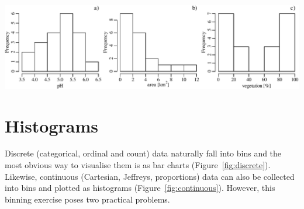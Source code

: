 \noindent\includegraphics[width=\textwidth]{../figures/continuous.pdf}\medskip
\begingroup {}
\label{fig:continuous}
\endgroup

\section{Histograms}\label{sec:histogram}

Discrete (categorical, ordinal and count) data naturally fall into
bins and the most obvious way to visualise them is as bar charts
(Figure~\ref{fig:discrete}).  Likewise, continuous (Cartesian,
Jeffreys, proportions) data can also be collected into bins and
plotted as histograms (Figure~\ref{fig:continuous}). However, this
binning exercise poses two practical problems.

